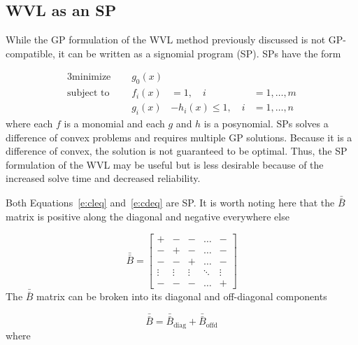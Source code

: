 \documentclass[10pt, a4paper]{article}
\begin{document}
\subsection*{WVL as an SP}

While the GP formulation of the WVL method previously discussed is not GP-compatible, it can be written as a signomial program (SP).  SPs have the form

\begin{alignat*}{3}
    \text{minimize }\quad & g_0 (x) && \\
    \text{subject to }\quad & f_i(x) &= 1,\quad  i&=1,\dots,m \\
                            & g_i(x) &- h_i(x) \leq 1, \quad i&=1,\dots,n 
\end{alignat*}
where each $f$ is a monomial and each $g$ and $h$ is a posynomial. SPs solves a difference of convex problems and requires multiple GP solutions.  Because it is a difference of convex, the solution is not guaranteed to be optimal.  Thus, the SP formulation of the WVL may be useful but is less desirable because of the increased solve time and decreased reliability. 

Both Equations~\ref{e:cleq} and~\ref{e:cdeq} are SP.  It is worth noting here that the $\bar{\bar{B}}$ matrix is positive along the diagonal and negative everywhere else

\begin{equation*}
    \bar{\bar{B}} =  
    \begin{bmatrix} 
        + & - & - & \dots & - \\
        - & + & - & \dots & - \\
        - & - & + & \dots & - \\
        \vdots & \vdots & \vdots & \ddots & \vdots \\
        - & - & - & \dots & + 
    \end{bmatrix}
\end{equation*}
The $\bar{\bar{B}}$ matrix can be broken into its diagonal and off-diagonal components 

\begin{equation}
    \bar{\bar{B}} = \bar{\bar{B}}_{\mathrm{diag}} + \bar{\bar{B}}_{\mathrm{offd}}
\end{equation}
where
\end{document}
